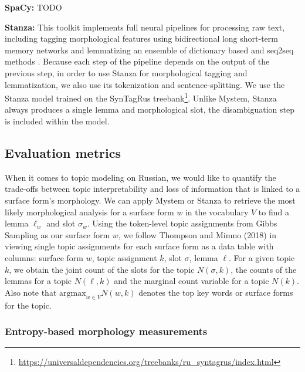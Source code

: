 \documentclass[11pt,a4paper]{article}
\newcommand{\argmax}{\mathrm{argmax}}
\begin{document}
\textbf{SpaCy:} TODO


\textbf{Stanza:} This toolkit implements full neural pipelines for processing raw text, including tagging morphological features using bidirectional long short-term memory networks and lemmatizing an ensemble of dictionary based and seq2seq methods \cite{qi2020stanza}. Because each step of the pipeline depends on the output of the previous step, in order to use Stanza for morphological tagging and lemmatization, we also use its tokenization and sentence-splitting. We use the Stanza model trained on the SynTagRus treebank\footnote{\url{https://universaldependencies.org/treebanks/ru_syntagrus/index.html}}. Unlike Mystem, Stanza always produces a single lemma and morphological slot, the disambiguation step is included within the model.

\subsection{Evaluation metrics}
When it comes to topic modeling on Russian, we would like to quantify the trade-offs between topic interpretability and loss of information that is linked to a surface form's morphology. We can apply Mystem or Stanza to retrieve the most likely morphological analysis for a surface form $w$ in the vocabulary $V$ to find a lemma $\ell_w$ and slot $\sigma_w$. Using the token-level topic assignments from Gibbs Sampling as our surface form $w$, we follow Thompson and Mimno (2018) in viewing single topic assignments for each surface form as a data table with columns: surface form $w$, topic assignment $k$, slot $\sigma$, lemma $\ell$. For a given topic $k$, we obtain the joint count of the slots for the topic $N(\sigma, k)$, the counts of the lemmas for a topic $N(\ell, k)$ and the marginal count variable for a topic $N(k)$. Also note that $\argmax_{w \in V} N(w, k)$ denotes the top key words or surface forms for the topic.

\subsubsection{Entropy-based morphology measurements}
\end{document}
